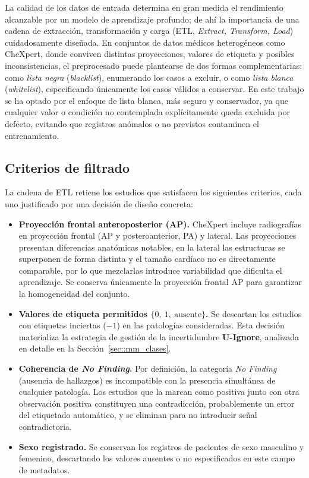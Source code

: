 La calidad de los datos de entrada determina en gran medida el rendimiento
alcanzable por un modelo de aprendizaje profundo; de ahí la importancia de una
cadena de extracción, transformación y carga (ETL, \textit{Extract, Transform,
Load}) cuidadosamente diseñada. En conjuntos de datos médicos heterogéneos como
CheXpert, donde conviven distintas proyecciones, valores de etiqueta y posibles
inconsistencias, el preprocesado puede plantearse de dos formas
complementarias: como \textit{lista negra} (\textit{blacklist}), enumerando los
casos a excluir, o como \textit{lista blanca} (\textit{whitelist}), especificando
únicamente los casos válidos a conservar. En este trabajo se ha optado por el
enfoque de lista blanca, más seguro y conservador, ya que cualquier valor o
condición no contemplada explícitamente queda excluida por defecto, evitando que
registros anómalos o no previstos contaminen el entrenamiento.

\subsection{Criterios de filtrado}

La cadena de ETL retiene los estudios que satisfacen los siguientes criterios,
cada uno justificado por una decisión de diseño concreta:

\begin{itemize}
  \item \textbf{Proyección frontal anteroposterior (AP).} CheXpert incluye
        radiografías en proyección frontal (AP y posteroanterior, PA) y lateral.
        Las proyecciones presentan diferencias anatómicas notables, en la lateral
        las estructuras se superponen de forma distinta y el tamaño cardíaco no es
        directamente comparable, por lo que mezclarlas introduce variabilidad
        que dificulta el aprendizaje. Se conserva únicamente la proyección
        frontal AP para garantizar la homogeneidad del conjunto.
  \item \textbf{Valores de etiqueta permitidos $\{0,\ 1,\ \text{ausente}\}$.} Se
        descartan los estudios con etiquetas inciertas ($-1$) en las patologías
        consideradas. Esta decisión materializa la estrategia de gestión de la
        incertidumbre \textbf{U-Ignore}, analizada en detalle en la
        Sección~\ref{sec::mm_clases}.
  \item \textbf{Coherencia de \textit{No Finding}.} Por definición, la categoría
        \textit{No Finding} (ausencia de hallazgos) es incompatible con la
        presencia simultánea de cualquier patología. Los estudios que la marcan
        como positiva junto con otra observación positiva constituyen una
        contradicción, probablemente un error del etiquetado automático, y se
        eliminan para no introducir señal contradictoria.
  \item \textbf{Sexo registrado.} Se conservan los registros de pacientes de sexo
        masculino y femenino, descartando los valores ausentes o no
        especificados en este campo de metadatos.
\end{itemize}

